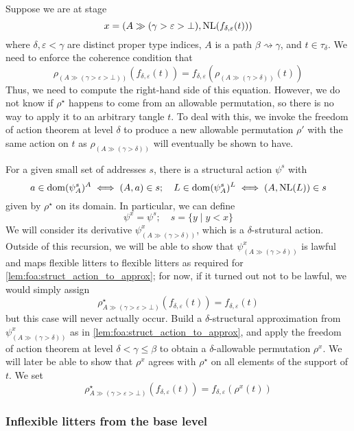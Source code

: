 Suppose we are at stage
\[ x = (A \gg (\gamma > \varepsilon > \bot), \operatorname{NL}(f_{\delta,\varepsilon}(t))) \]
where \( \delta, \varepsilon < \gamma \) are distinct proper type indices, \( A \) is a path \( \beta \rightsquigarrow \gamma \), and \( t \in \tau_\delta \).
We need to enforce the coherence condition that
\[ \rho_{(A \gg (\gamma > \varepsilon > \bot))}(f_{\delta,\varepsilon}(t)) = f_{\delta,\varepsilon}(\rho_{(A \gg (\gamma > \delta))}(t)) \]
Thus, we need to compute the right-hand side of this equation.
However, we do not know if \( \rho^\star \) happens to come from an allowable permutation, so there is no way to apply it to an arbitrary tangle \( t \).
To deal with this, we invoke the freedom of action theorem at level \( \delta \) to produce a new allowable permutation \( \rho' \) with the same action on \( t \) as \( \rho_{(A \gg (\gamma > \delta))} \) will eventually be shown to have.

For a given small set of addresses \( s \), there is a structural action \( \psi^s \) with
\[ a \in \operatorname{dom} (\psi^s_A)^A \iff (A, a) \in s;\quad L \in \operatorname{dom} (\psi^s_A)^L \iff (A, \operatorname{NL}(L)) \in s \]
given by \( \rho^\star \) on its domain.
In particular, we can define
\[ \psi^x = \psi^s;\quad s = \{ y \mid y < x \} \]
We will consider its derivative \( \psi^x_{(A \gg (\gamma > \delta))} \), which is a \( \delta \)-strutural action.
Outside of this recursion, we will be able to show that \( \psi^x_{(A \gg (\gamma > \delta))} \) is lawful and maps flexible litters to flexible litters as required for \cref{lem:foa:struct_action_to_approx}; for now, if it turned out not to be lawful, we would simply assign
\[ \rho^\star_{A \gg (\gamma > \varepsilon > \bot)}(f_{\delta,\varepsilon}(t)) = f_{\delta,\varepsilon}(t) \]
but this case will never actually occur.
Build a \( \delta \)-structural approximation from \( \psi^x_{(A \gg (\gamma > \delta))} \) as in \cref{lem:foa:struct_action_to_approx}, and apply the freedom of action theorem at level \( \delta < \gamma \leq \beta \) to obtain a \( \delta \)-allowable permutation \( \rho^x \).
We will later be able to show that \( \rho^x \) agrees with \( \rho^\star \) on all elements of the support of \( t \).
We set
\[ \rho^\star_{A \gg (\gamma > \varepsilon > \bot)}(f_{\delta,\varepsilon}(t)) = f_{\delta,\varepsilon}(\rho^x(t)) \]

\subsubsection{Inflexible litters from the base level}
\label{ss:foa:inflexible_bot}

